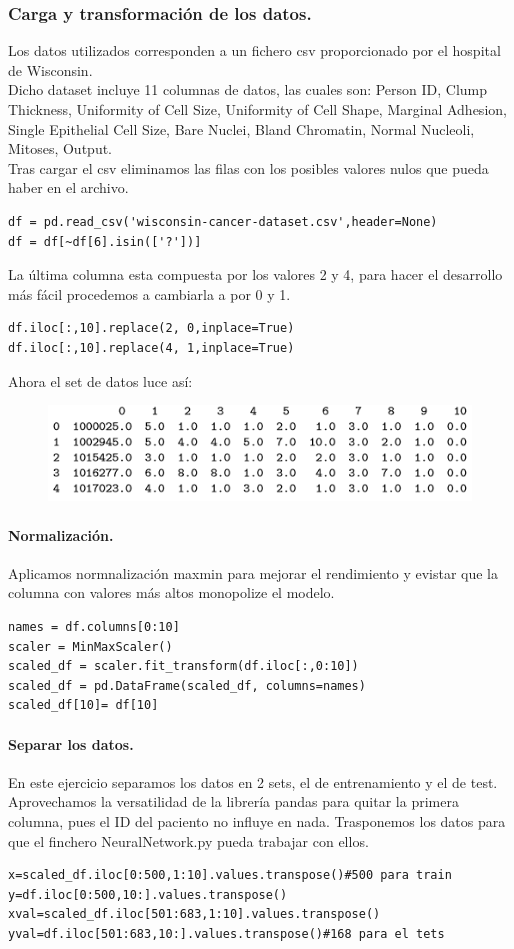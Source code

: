 \documentclass[a4paper,10pt]{article}
\begin{document}
\subsubsection{Carga y transformación de los datos.}
Los datos utilizados corresponden a un fichero csv proporcionado por el hospital de Wisconsin.\\
Dicho dataset incluye 11 columnas de datos, las cuales son: Person ID, Clump Thickness, Uniformity of Cell Size, Uniformity of Cell Shape, Marginal Adhesion, Single Epithelial Cell Size, Bare Nuclei, Bland Chromatin, Normal Nucleoli, Mitoses, Output.\\
Tras cargar el csv eliminamos las filas con los posibles valores nulos que pueda haber en el archivo.
\begin{lstlisting}
df = pd.read_csv('wisconsin-cancer-dataset.csv',header=None)
df = df[~df[6].isin(['?'])]
\end{lstlisting}
La última columna esta compuesta por los valores 2 y 4,  para hacer el desarrollo más fácil procedemos a cambiarla a por 0 y 1.
\begin{lstlisting}
df.iloc[:,10].replace(2, 0,inplace=True)
df.iloc[:,10].replace(4, 1,inplace=True)
\end{lstlisting}
Ahora el set de datos luce así: 
\begin{figure}[H]
\centering
\includegraphics{Annotation 2020-03-23 185932.png}
\end{figure}
\paragraph{Normalización.}
Aplicamos normnalización maxmin para mejorar el rendimiento y evistar que la columna con valores más altos monopolize el modelo. 
\begin{lstlisting}
names = df.columns[0:10]
scaler = MinMaxScaler() 
scaled_df = scaler.fit_transform(df.iloc[:,0:10]) 
scaled_df = pd.DataFrame(scaled_df, columns=names)
scaled_df[10]= df[10]
\end{lstlisting}
\paragraph{Separar los datos.}
En este ejercicio separamos los datos en 2 sets, el de entrenamiento y el de test. Aprovechamos la versatilidad de la librería pandas para quitar la primera columna, pues el ID del paciento no influye en nada. Trasponemos los datos para que el finchero NeuralNetwork.py pueda trabajar con ellos.
\begin{lstlisting}
x=scaled_df.iloc[0:500,1:10].values.transpose()#500 para train
y=df.iloc[0:500,10:].values.transpose()
xval=scaled_df.iloc[501:683,1:10].values.transpose()
yval=df.iloc[501:683,10:].values.transpose()#168 para el tets
\end{lstlisting}
\end{document}

